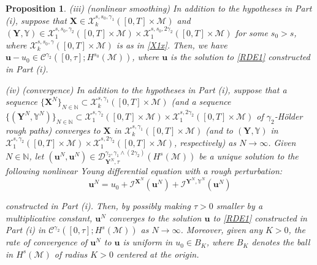 \documentclass[letterpaper, 11pt,  reqno]{amsart}
\newtheorem{proposition}[theorem]{Proposition}
\newcommand{\1}{\hspace{0.5mm}\textup{I}\hspace{0.5mm}}
\newcommand{\I}{\mathcal{I}}
\newcommand{\noi}{\noindent}
\newcommand{\CC}{\mathcal{C}}
\newcommand{\D}{\mathcal{D}}
\newcommand{\g}{\gamma}
\newcommand{\M}{\mathcal{M}}
\newcommand{\N}{\mathbb{N}}
\newcommand{\cC}{\mathcal{C}}
\newcommand{\cX}{\mathcal{X}}
\newcommand{\uu}{\mathbf{u}}
\newcommand{\YYb}{\mathbb{Y}}
\newcommand{\XX}{\mathbf{X}}
\newcommand{\YY}{\mathbf{Y}}
\numberwithin{equation}{section}
\numberwithin{theorem}{section}
\begin{document}
\begin{proposition}
\smallskip

\noi
\textup{(iii) (nonlinear smoothing)}
In addition to the hypotheses in Part (i), 
suppose  that  $\XX \in \cX^{s, s_0, \g_1}_k([0, T]\times \M)$
and $(\YY, \YYb)  \in \cX^{s, s_0, \g_2}_1([0, T]\times \M)
\times \cX^{s, s_0, 2\g_2}_1([0, T]\times \M)$
for some $s_0 > s$, 
where $\cX^{s, s_0, \g}_k([0, T]\times \M)$  is  as in \eqref{X1x}.
Then, we have
 $\uu - u_0 \in \cC^{\g_2}([0, \tau]; H^{s_0}(\M))$, 
 where $\uu$ is the solution to \eqref{RDE1}
 constructed in Part (i).

%
%
%
\smallskip

\noi
\textup{(iv) (convergence)}
In addition to the hypotheses in Part (i), 
suppose  that a sequence $\{\XX^N\}_{N \in \N}\subset 
 \cX^{s, \g_1}_k([0, T]\times \M)$
\textup{(}and 
a sequence $\{(\YY^N, \YYb^N)\}_{N \in \N}\subset 
 \cX^{s, \g_2}_1([0, T]\times \M)
 \times  \cX^{s,2 \g_2}_1([0, T]\times \M) $
 of $\g_2$-H\"older rough paths\textup{)}
 converges to $\XX$ in 
 $ \cX^{s, \g_1}_k([0, T]\times \M)$
\textup{(}and 
to  $(\YY, \YYb)$ in 
 $ \cX^{s, \g_2}_1([0, T]\times \M)\times \cX^{s, 2\g_2}_1([0, T]\times \M)$, respectively\textup{)}
  as $N \to \infty$.
Given $N \in \N$, let 
 $(\uu^N, \uu^N)
\in 
\D^{\g_2, \g_1 \wedge (2\g_2)}_{\YY^N, \tau}(H^s(\M))$
be a unique solution
to the following nonlinear Young differential equation
with a rough 
perturbation\textup{:}
\begin{equation}
\label{RDE1x}
\uu^N = u_0 + \I^{\XX^N}(\uu^N)
+ \I^{\YY^N, \YYb^N}(\uu^N)
\end{equation}

\noi
constructed in Part (i).  
Then, 
by possibly making $\tau > 0$ smaller by a multiplicative constant,  
$\uu^N$  
converges to the solution $\uu$ to \eqref{RDE1}
constructed in Part (i)  
 in $\CC^{\g_2}([0, \tau]; H^s(\M))$
as $N \to \infty$.
Moreover, 
given any $K > 0$, 
the rate of convergence of $\uu^N$ to $\uu$ is
uniform in $u_0 \in B_K$,
where
$B_K$ denotes the ball 
in $H^s(\M)$
of radius $K > 0$ centered at the origin.





\end{proposition}
\end{document}
